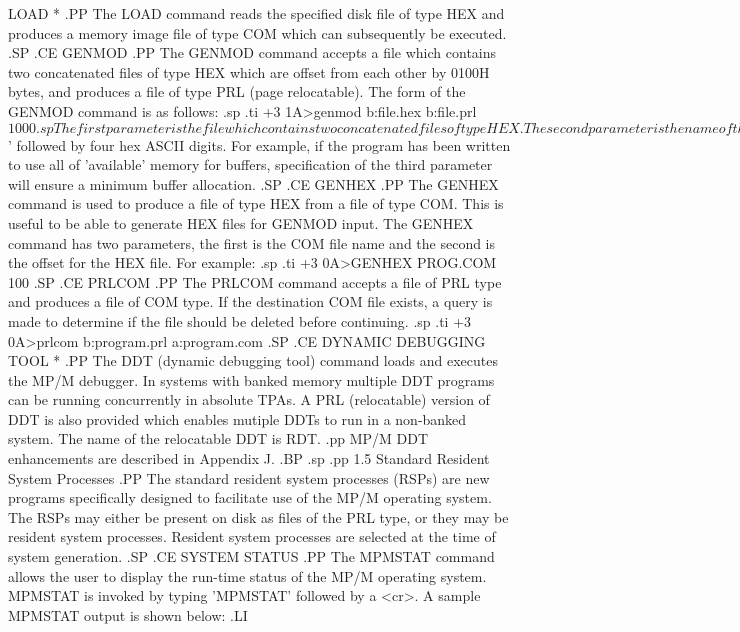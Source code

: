 LOAD *
.PP
The LOAD command reads the specified disk file of type HEX and
produces a memory image file of type COM which can subsequently
be executed.
.SP
.CE
GENMOD
.PP
The GENMOD command accepts a file which contains two concatenated
files of type HEX which are offset from each other by 0100H bytes,
and produces a file of type PRL (page relocatable).
The form of the GENMOD command is as follows:
.sp
.ti +3
1A>genmod b:file.hex b:file.prl $1000
.sp
The first parameter is the file which contains two concatenated files
of type HEX.  The second parameter is the name of the destination file
of type PRL.  The optional third parameter is a specification of additional memory required by the program beyond the explicit code
space.  The form of the third parameter is a '$' followed by four
hex ASCII digits.
For example, if the program has been written to use all of 'available'
memory for buffers, specification of the third parameter will ensure
a minimum buffer allocation.
.SP
.CE
GENHEX
.PP
The  GENHEX  command is used to produce a file of type  HEX
from  a  file of type COM.   This is useful to be  able  to
generate  HEX files for GENMOD input.   The GENHEX  command
has two parameters,  the first is the COM file name and the
second is the offset for the HEX file.  For example:
.sp
.ti +3
0A>GENHEX PROG.COM 100
.SP
.CE
PRLCOM
.PP
The  PRLCOM command accepts a file of PRL type and produces
a file of COM type.  If the destination COM file exists, a
query is made to determine if the file should be deleted
before continuing.
.sp
.ti +3
0A>prlcom b:program.prl a:program.com
.SP
.CE
DYNAMIC DEBUGGING TOOL *
.PP
The DDT (dynamic debugging tool) command loads and executes the
MP/M debugger.
In systems with banked memory multiple DDT programs can be running
concurrently in absolute TPAs.  A PRL (relocatable)
version of DDT is also provided
which enables mutiple DDTs to run in a non-banked system.  The
name of the relocatable DDT is RDT.
.pp
MP/M DDT enhancements are described in Appendix J.
.BP
.sp
.pp
1.5  Standard Resident System Processes
.PP
The standard resident system processes (RSPs) are new programs
specifically
designed to facilitate use of the MP/M operating system.  The RSPs
may either be present on disk as files of the PRL type, or they
may be resident system processes.  Resident system processes are
selected at the time of system generation.
.SP
.CE
SYSTEM STATUS
.PP
The MPMSTAT command allows the user to display the run-time status
of the MP/M operating system.  MPMSTAT is invoked by typing 'MPMSTAT'
followed by a <cr>.  A sample MPMSTAT output is shown below:
.LI

